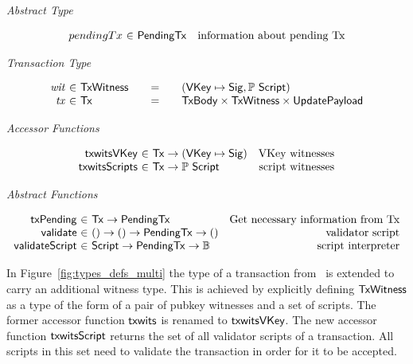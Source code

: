 \documentclass[11pt,a4paper,dvipsnames]{article}
\newcommand{\Bool}{\ensuremath{\mathbb{B}}}
\newcommand{\Tx}{\type{Tx}}
\newcommand{\TxWitness}{\type{TxWitness}}
\newcommand{\TxBody}{\type{TxBody}}
\newcommand{\UpdatePayload}{\type{UpdatePayload}}
\newcommand{\Script}{\type{Script}}
\newcommand{\PendingTx}{\type{PendingTx}}
\newcommand{\VKey}{\type{VKey}}
\newcommand{\Sig}{\type{Sig}}
\theoremstyle{definition}
\begin{document}
\begin{figure*}[hbt]
  \emph{Abstract Type}

  \begin{equation*}
    \begin{array}{r@{~\in~}lr}
      pendingTx & \PendingTx & \text{information about pending Tx}
    \end{array}
  \end{equation*}

  \emph{Transaction Type}

  \begin{equation*}
    \begin{array}{r@{~\in~}l@{\qquad=\qquad}l}
      \var{wit} & \TxWitness & (\VKey \mapsto \Sig, \powerset \Script)
      \\
      \var{tx}
      & \Tx
      & \TxBody \times \TxWitness \times \UpdatePayload
      \\
    \end{array}
  \end{equation*}

  \emph{Accessor Functions}

  \begin{equation*}
    \begin{array}{r@{~\in~}lr}
      \fun{txwitsVKey} & \Tx \to (\VKey \mapsto \Sig) & \text{VKey witnesses} \\
      \fun{txwitsScripts} & \Tx \to \powerset{\Script} & \text{script witnesses}
    \end{array}
  \end{equation*}

  \emph{Abstract Functions}

  \begin{equation*}
    \begin{array}{r@{~\in~}lr}
      \fun{txPending} & \Tx \to \PendingTx & \text{Get necessary information from Tx} \\
      \fun{validate} & () \to () \to \PendingTx \to () & \text{validator script}\\
      \fun{validateScript} & \Script \to \PendingTx \to \Bool & \text{script interpreter}
    \end{array}
  \end{equation*}
  \caption{Types for Transaction Inputs with Scripts}
  \label{fig:types_defs_multi}
\end{figure*}

In Figure~\ref{fig:types_defs_multi} the type of a transaction
from~\cite{shelley_formal_spec} is extended to carry an additional witness
type. This is achieved by explicitly defining $\TxWitness$ as a type of the form
of a pair of pubkey witnesses and a set of scripts. The former accessor function
$\mathsf{txwits}$ is renamed to $\mathsf{txwitsVKey}$. The new accessor function
$\mathsf{txwitsScript}$ returns the set of all validator scripts of a
transaction. All scripts in this set need to validate the transaction in order
for it to be accepted.
\end{document}
